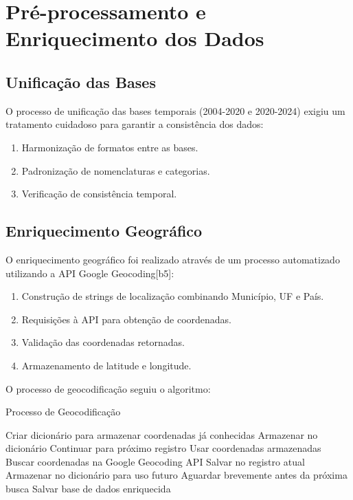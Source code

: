 \documentclass[conference]{IEEEtran}
\begin{document}
\section{Pré-processamento e Enriquecimento dos Dados}

\subsection{Unificação das Bases}
O processo de unificação das bases temporais (2004-2020 e 2020-2024) exigiu um tratamento cuidadoso para garantir a consistência dos dados:

\begin{enumerate}
\item Harmonização de formatos entre as bases.
\item Padronização de nomenclaturas e categorias.
\item Verificação de consistência temporal.
\end{enumerate}

\subsection{Enriquecimento Geográfico}
O enriquecimento geográfico foi realizado através de um processo automatizado utilizando a API Google Geocoding[b5]:

\begin{enumerate}
\item Construção de strings de localização combinando Município, UF e País.
\item Requisições à API para obtenção de coordenadas.
\item Validação das coordenadas retornadas.
\item Armazenamento de latitude e longitude.
\end{enumerate}\vspace{3cm}

O processo de geocodificação seguiu o algoritmo:

\begin{algorithm}
\caption{Processo de Geocodificação}
\begin{algorithmic}[1]
\STATE Criar dicionário para armazenar coordenadas já conhecidas
        \STATE Armazenar no dicionário
        \STATE Continuar para próximo registro
    \ENDIF
        \STATE Usar coordenadas armazenadas
    \ELSE
        \STATE Buscar coordenadas na Google Geocoding API
            \STATE Salvar no registro atual
            \STATE Armazenar no dicionário para uso futuro
        \ENDIF
        \STATE Aguardar brevemente antes da próxima busca
    \ENDIF
\ENDFOR
\STATE Salvar base de dados enriquecida
\end{algorithmic}
\end{algorithm}
\end{document}
